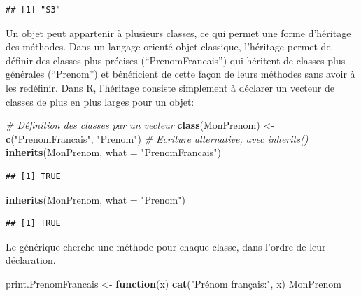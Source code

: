 \documentclass[
  12pt,
  french,
  a4paper,
  extrafontsizes,onecolumn,openright
  ]{memoir}
\newenvironment{Shaded}{\begin{snugshade}}{\end{snugshade}}
\newcommand{\CommentTok}[1]{\textcolor[rgb]{0.56,0.35,0.01}{\textit{#1}}}
\newcommand{\ControlFlowTok}[1]{\textcolor[rgb]{0.13,0.29,0.53}{\textbf{#1}}}
\newcommand{\DataTypeTok}[1]{\textcolor[rgb]{0.13,0.29,0.53}{#1}}
\newcommand{\KeywordTok}[1]{\textcolor[rgb]{0.13,0.29,0.53}{\textbf{#1}}}
\newcommand{\NormalTok}[1]{#1}
\newcommand{\StringTok}[1]{\textcolor[rgb]{0.31,0.60,0.02}{#1}}
\begin{document}
\begin{verbatim}
## [1] "S3"
\end{verbatim}

\normalsize

Un objet peut appartenir à plusieurs classes, ce qui permet une forme d'héritage des méthodes.
Dans un langage orienté objet classique, l'héritage permet de définir des classes plus précises (\enquote{PrenomFrancais}) qui héritent de classes plus générales (\enquote{Prenom}) et bénéficient de cette façon de leurs méthodes sans avoir à les redéfinir.
Dans R, l'héritage consiste simplement à déclarer un vecteur de classes de plus en plus larges pour un objet:

\scriptsize

\begin{Shaded}
\begin{Highlighting}[]
\CommentTok{# Définition des classes par un vecteur}
\KeywordTok{class}\NormalTok{(MonPrenom) <-}\StringTok{ }\KeywordTok{c}\NormalTok{(}\StringTok{"PrenomFrancais"}\NormalTok{, }\StringTok{"Prenom"}\NormalTok{)}
\CommentTok{# Ecriture alternative, avec inherits()}
\KeywordTok{inherits}\NormalTok{(MonPrenom, }\DataTypeTok{what =} \StringTok{"PrenomFrancais"}\NormalTok{)}
\end{Highlighting}
\end{Shaded}

\begin{verbatim}
## [1] TRUE
\end{verbatim}

\begin{Shaded}
\begin{Highlighting}[]
\KeywordTok{inherits}\NormalTok{(MonPrenom, }\DataTypeTok{what =} \StringTok{"Prenom"}\NormalTok{)}
\end{Highlighting}
\end{Shaded}

\begin{verbatim}
## [1] TRUE
\end{verbatim}

\normalsize

Le générique cherche une méthode pour chaque classe, dans l'ordre de leur déclaration.

\scriptsize

\begin{Shaded}
\begin{Highlighting}[]
\NormalTok{print.PrenomFrancais <-}\StringTok{ }\ControlFlowTok{function}\NormalTok{(x) }\KeywordTok{cat}\NormalTok{(}\StringTok{"Prénom français:"}\NormalTok{,}
\NormalTok{    x)}
\NormalTok{MonPrenom}
\end{Highlighting}
\end{Shaded}
\end{document}
